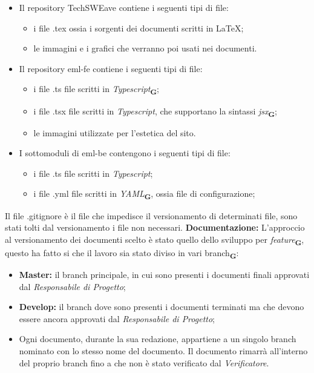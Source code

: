 \begin{itemize}
    \item Il repository TechSWEave contiene i seguenti tipi di file:
          \begin{itemize}
              \item i file {\selectfont .tex} ossia i sorgenti dei documenti scritti in \LaTeX;
              \item le immagini e i grafici che verranno poi usati nei documenti.
          \end{itemize}
    \item Il repository eml-fe contiene i seguenti tipi di file:
          \begin{itemize}
              \item i file {\selectfont .ts} file scritti in \textit{Typescript}\textsubscript{\textbf{G}};
              \item i file {\selectfont .tsx} file scritti in \textit{Typescript}, che supportano la sintassi \textit{jsx}\textsubscript{\textbf{G}};
              \item le immagini utilizzate per l'estetica del sito.
          \end{itemize}
    \item I sottomoduli di eml-be contengono i seguenti tipi di file:
          \begin{itemize}
              \item i file {\selectfont .ts} file scritti in \textit{Typescript};
              \item i file {\selectfont .yml} file scritti in \textit{YAML}\textsubscript{\textbf{G}}, ossia file di configurazione;
          \end{itemize}
\end{itemize}
Il file {\selectfont .gitignore} è il file che impedisce il versionamento di determinati file, sono stati tolti dal versionamento i file non necessari.
\textbf{Documentazione:}
L'approccio al versionamento dei documenti scelto è stato quello dello sviluppo per \textit{feature}\textsubscript{\textbf{G}}, questo ha fatto si che il lavoro sia stato diviso in vari branch\textsubscript{\textbf{G}}:
\begin{itemize}
    \renewcommand\labelitemi{-}
    \item \textbf{Master:} il branch principale, in cui sono presenti i documenti finali approvati dal \textit{Responsabile di Progetto};
    \item \textbf{Develop:} il branch dove sono presenti i documenti terminati ma che devono essere ancora approvati dal \textit{Responsabile di Progetto};
    \item Ogni documento, durante la sua redazione, appartiene a un singolo branch nominato con lo stesso nome del documento. Il documento rimarrà all'interno del proprio branch fino a che non è stato verificato dal \textit{Verificatore}.
\end{itemize}
